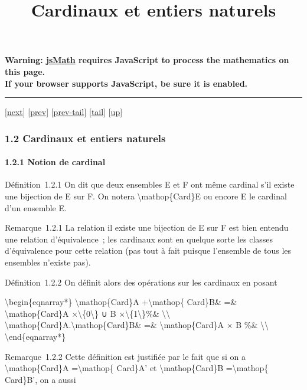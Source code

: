 \documentclass[]{article}
\title{Cardinaux et entiers naturels}
\author{}
\date{}
\begin{document}
\maketitle

\textbf{Warning: \href{http://www.math.union.edu/locate/jsMath}{jsMath}
requires JavaScript to process the mathematics on this page.\\ If your
browser supports JavaScript, be sure it is enabled.}

\begin{center}\rule{3in}{0.4pt}\end{center}

{[}\href{coursse3.html}{next}{]} {[}\href{coursse1.html}{prev}{]}
{[}\href{coursse1.html\#tailcoursse1.html}{prev-tail}{]}
{[}\hyperref[tailcoursse2.html]{tail}{]}
{[}\href{coursch2.html\#coursse2.html}{up}{]}

\subsubsection{1.2 Cardinaux et entiers naturels}

\paragraph{1.2.1 Notion de cardinal}

Définition~1.2.1 On dit que deux ensembles E et F ont même cardinal s'il
existe une bijection de E sur F. On notera
\textbackslash{}mathop\{Card\}E ou encore \textbar{}E\textbar{} le
cardinal d'un ensemble E.

Remarque~1.2.1 La relation il existe une bijection de E sur F est bien
entendu une relation d'équivalence~; les cardinaux sont en quelque sorte
les classes d'équivalence pour cette relation (pas tout à fait puisque
l'ensemble de tous les ensembles n'existe pas).

Définition~1.2.2 On définit alors des opérations sur les cardinaux en
posant

\textbackslash{}begin\{eqnarray*\} \textbackslash{}mathop\{Card\}A
+\textbackslash{}mathop\{ Card\}B\& =\& \textbackslash{}mathop\{Card\}A
×\textbackslash{}\{0\textbackslash{}\} ∪ B
×\textbackslash{}\{1\textbackslash{}\}\%\&
\textbackslash{}\textbackslash{}
\textbackslash{}mathop\{Card\}A.\textbackslash{}mathop\{Card\}B\& =\&
\textbackslash{}mathop\{Card\}A × B \%\&
\textbackslash{}\textbackslash{} \textbackslash{}end\{eqnarray*\}

Remarque~1.2.2 Cette définition est justifiée par le fait que si on a
\textbackslash{}mathop\{Card\}A =\textbackslash{}mathop\{ Card\}A' et
\textbackslash{}mathop\{Card\}B =\textbackslash{}mathop\{ Card\}B', on a
aussi
\end{document}
